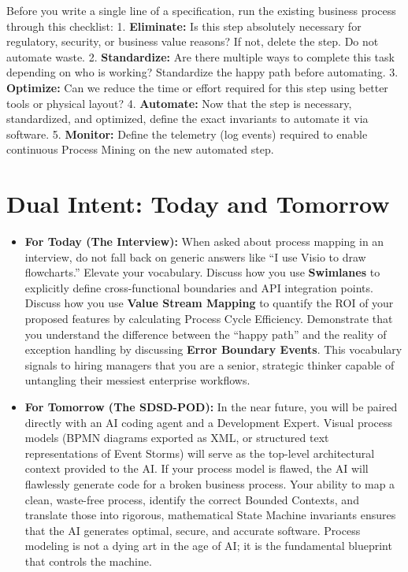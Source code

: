 \documentclass[
  11pt,
  openany,
  oneside]{book}
\begin{document}
Before you write a single line of a specification, run the existing
business process through this checklist: 1. \textbf{Eliminate:} Is this
step absolutely necessary for regulatory, security, or business value
reasons? If not, delete the step. Do not automate waste. 2.
\textbf{Standardize:} Are there multiple ways to complete this task
depending on who is working? Standardize the happy path before
automating. 3. \textbf{Optimize:} Can we reduce the time or effort
required for this step using better tools or physical layout? 4.
\textbf{Automate:} Now that the step is necessary, standardized, and
optimized, define the exact invariants to automate it via software. 5.
\textbf{Monitor:} Define the telemetry (log events) required to enable
continuous Process Mining on the new automated step.

\bigskip

\section{Dual Intent: Today and
Tomorrow}\label{dual-intent-today-and-tomorrow}

\begin{itemize}
\item
  \textbf{For Today (The Interview):} When asked about process mapping
  in an interview, do not fall back on generic answers like ``I use
  Visio to draw flowcharts.'' Elevate your vocabulary. Discuss how you
  use \textbf{Swimlanes} to explicitly define cross-functional
  boundaries and API integration points. Discuss how you use
  \textbf{Value Stream Mapping} to quantify the ROI of your proposed
  features by calculating Process Cycle Efficiency. Demonstrate that you
  understand the difference between the ``happy path'' and the reality
  of exception handling by discussing \textbf{Error Boundary Events}.
  This vocabulary signals to hiring managers that you are a senior,
  strategic thinker capable of untangling their messiest enterprise
  workflows.
\item
  \textbf{For Tomorrow (The SDSD-POD):} In the near future, you will be
  paired directly with an AI coding agent and a Development Expert.
  Visual process models (BPMN diagrams exported as XML, or structured
  text representations of Event Storms) will serve as the top-level
  architectural context provided to the AI. If your process model is
  flawed, the AI will flawlessly generate code for a broken business
  process. Your ability to map a clean, waste-free process, identify the
  correct Bounded Contexts, and translate those into rigorous,
  mathematical State Machine invariants ensures that the AI generates
  optimal, secure, and accurate software. Process modeling is not a
  dying art in the age of AI; it is the fundamental blueprint that
  controls the machine.
\end{itemize}
\end{document}
